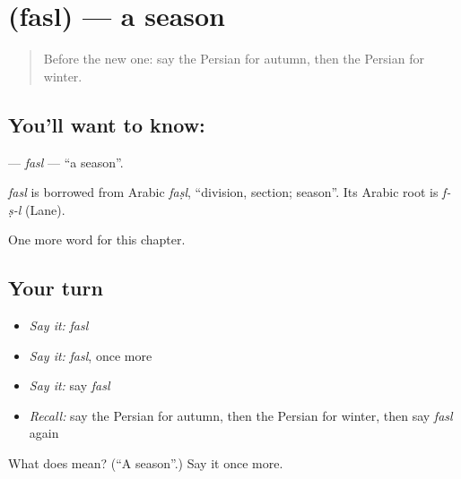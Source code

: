 \section[\texorpdfstring{\fa{فصل} (fasl)}{فصل (fasl)}]{ (fasl) — a season}

\label{lesson:FA-C80-fasl}



\begin{quote}
Before the new one: say the Persian for autumn, then the Persian for winter.
\end{quote}

\subsection*{You'll want to know: }
\textbf{} — \emph{fasl} — \textquotedblleft{}a season\textquotedblright{}.

\begin{cousinweb}
\emph{fasl} is borrowed from Arabic \emph{faṣl}, \textquotedblleft{}division, section; season\textquotedblright{}. Its Arabic root is \emph{f-ṣ-l} (Lane).
\end{cousinweb}

\begin{grammarlens}[title={What you've built}]
One more word for this chapter.
\end{grammarlens}

\subsection*{Your turn}
\begin{itemize}
\raggedright
  \item \emph{Say it:} \emph{fasl}
  \item \emph{Say it:} \emph{fasl}, once more
  \item \emph{Say it:} say \emph{fasl}
  \item \emph{Recall:} say the Persian for autumn, then the Persian for winter, then say \emph{fasl} again
\end{itemize}

\begin{tcolorbox}[breakable,colback=teal!4,colframe=teal!35!black,title={Before you move on}]
What does  mean? (\textquotedblleft{}A season\textquotedblright{}.) Say it once more.
\end{tcolorbox}
